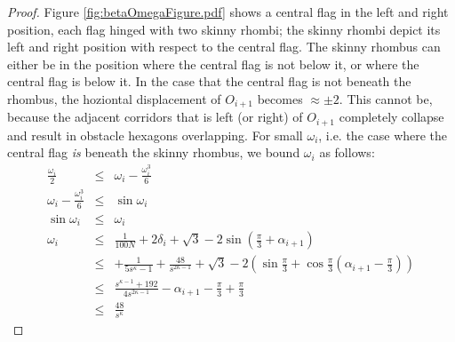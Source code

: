 \documentclass[10pt]{CSUNthesis}
\theoremstyle{plain}%
\theoremstyle{definition}
\theoremstyle{remark}
\newcommand{\lr}[1]{\left( #1 \right)}
\begin{document}
\begin{proof}
Figure \ref{fig:betaOmegaFigure.pdf} shows a central flag in the left and right position, each flag hinged with two skinny rhombi; the skinny rhombi depict its left and right position with respect to the central flag.
The skinny rhombus can either be in the position where the central flag is not below it, or where the central flag is below it.  
In the case that the central flag is not beneath the rhombus, the hoziontal displacement of $O_{i+1}$ becomes $\approx \pm 2$.  
This cannot be, because the adjacent corridors that is left (or right) of $O_{i+1}$ completely collapse and result in obstacle hexagons overlapping.
For small $\omega_i$, i.e. the case where the central flag \textit{is} beneath the skinny rhombus, we bound $\omega_i$ as follows:
\begin{eqnarray*}
\frac{\omega_i}{2}&\leq& \omega_i - \frac{\omega_i^3}{6} \\
\omega_i - \frac{\omega_i^3}{6} &\leq& \sin \omega_i\\
\sin \omega_i &\leq& \omega_i \\
\omega_i &\leq& \frac{1}{100N} + 2 \delta_i + \sqrt{3}- 2 \sin \lr{\frac{\pi}{3} + \alpha_{i+1}}\\
&\leq&+ \frac{1}{5s^\kappa - 1} + \frac{48}{s^{2\kappa - 1}} +\sqrt{3} - 2 \lr{\sin \frac{\pi}{3} + \cos \frac{\pi}{3} \lr{\alpha_{i+1} - \frac{\pi}{3} } }\\
&\leq&  \frac{s^{\kappa-1} + 192}{4 s^{2\kappa-1}} - \alpha_{i+1} - \frac{\pi}{3} + \frac{\pi}{3}\\
&\leq& \frac{48}{s^\kappa}
\end{eqnarray*}


\end{proof}
\end{document}
